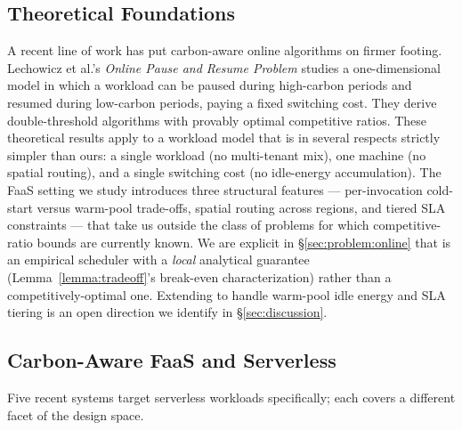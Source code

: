 \subsection{Theoretical Foundations}

A recent line of work has put carbon-aware online algorithms on
firmer footing. Lechowicz et al.'s \emph{Online Pause and Resume
Problem} \citep{lechowicz2024online} studies a one-dimensional model
in which a workload can be paused during high-carbon periods and
resumed during low-carbon periods, paying a fixed switching cost.
They derive double-threshold algorithms with provably optimal
competitive ratios. These theoretical results apply to a workload
model that is in several respects strictly simpler than ours: a
single workload (no multi-tenant mix), one machine (no spatial
routing), and a single switching cost (no idle-energy accumulation).
The FaaS setting we study introduces three structural features ---
per-invocation cold-start versus warm-pool trade-offs, spatial
routing across regions, and tiered SLA constraints --- that take us
outside the class of problems for which competitive-ratio bounds are
currently known. We are explicit in \S\ref{sec:problem:online} that
\GreenFaaS{} is an empirical scheduler with a \emph{local}
analytical guarantee (Lemma~\ref{lemma:tradeoff}'s break-even
characterization) rather than a competitively-optimal one. Extending
\citep{lechowicz2024online} to handle warm-pool idle energy and SLA
tiering is an open direction we identify in \S\ref{sec:discussion}.

\subsection{Carbon-Aware FaaS and Serverless}
\label{sec:related:faas}

Five recent systems target serverless workloads specifically; each
covers a different facet of the design space.

